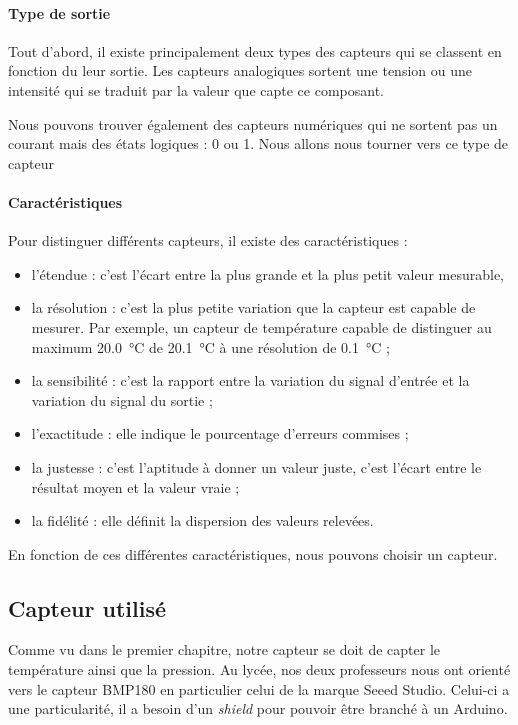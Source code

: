 \paragraph{Type de sortie} Tout d'abord, il existe principalement deux types des capteurs qui se classent en fonction du leur sortie. Les capteurs analogiques sortent une tension ou une intensité qui se traduit par la valeur que capte ce composant.

Nous pouvons trouver également des capteurs numériques qui ne sortent pas un courant mais des états logiques : 0 ou 1. Nous allons nous tourner vers ce type de capteur

\paragraph{Caractéristiques} Pour distinguer différents capteurs, il existe des caractéristiques :
\begin{itemize}
	\item l'étendue : c'est l'écart entre la plus grande et la plus petit valeur mesurable,
	\item la résolution : c'est la plus petite variation que la capteur est capable de mesurer. Par exemple, un capteur de température capable de distinguer au maximum \SI{20,0}{\celsius} de \SI{20,1}{\celsius} à une résolution de \SI{0,1}{\celsius} ;
	\item la sensibilité : c'est la rapport entre la variation du signal d'entrée et la variation du signal du sortie ;
	\item l'exactitude : elle indique le pourcentage d'erreurs commises ;
	\item la justesse : c'est l'aptitude à donner un valeur juste, c'est l'écart entre le résultat moyen et la valeur vraie ;
	\item la fidélité : elle définit la dispersion des valeurs relevées.
\end{itemize}

En fonction de ces différentes caractéristiques, nous pouvons choisir un capteur.

\subsection{Capteur utilisé}

Comme vu dans le premier chapitre, notre capteur se doit de capter le température ainsi que la pression. Au lycée, nos deux professeurs nous ont orienté vers le capteur BMP180 en particulier celui de la marque Seeed Studio. Celui-ci a une particularité, il a besoin d'un \emph{shield} pour pouvoir être branché à un Arduino.

